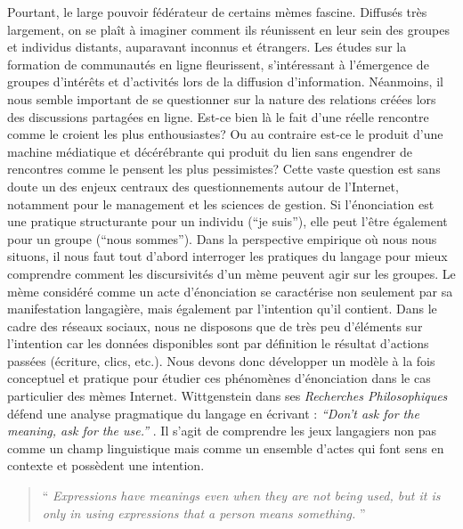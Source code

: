 Pourtant, le large pouvoir fédérateur de certains mèmes fascine. Diffusés très largement, on se plaît à imaginer comment ils réunissent en leur sein des groupes et individus distants, auparavant inconnus et étrangers. Les études sur la formation de communautés en ligne fleurissent, s'intéressant à l'émergence de groupes d{\textquoteright}intérêts et d{\textquoteright}activités lors de la diffusion d'information. Néanmoins, il nous semble important de se questionner sur la nature des relations créées lors des discussions partagées en ligne. Est-ce bien là le fait d{\textquoteright}une réelle rencontre comme le croient les plus enthousiastes? Ou au contraire est-ce le produit d{\textquoteright}une machine médiatique et décérébrante qui produit du lien sans engendrer de rencontres comme le pensent les plus pessimistes? Cette vaste question est sans doute un des enjeux centraux des questionnements autour de l{\textquoteright}Internet, notamment pour le management et les sciences de gestion. Si l{\textquoteright}énonciation est une pratique structurante pour un individu ({\textquotedblleft}je suis{\textquotedblright}), elle peut l{\textquoteright}être également pour un groupe ({\textquotedblleft}nous sommes{\textquotedblright}). Dans la perspective empirique o\`u nous nous situons, il nous faut tout d{\textquoteright}abord interroger les pratiques du langage pour mieux comprendre comment les discursivités d{\textquoteright}un mème peuvent agir sur les groupes. Le mème considéré comme un acte d{\textquoteright}énonciation se caractérise non seulement par sa manifestation langagière, mais également par l{\textquoteright}intention qu{\textquoteright}il contient. Dans le cadre des réseaux sociaux, nous ne disposons que de très peu d{\textquoteright}éléments sur l{\textquoteright}intention car les données disponibles sont par définition le résultat d{\textquoteright}actions passées (écriture, clics, etc.).\textit{ }Nous devons donc développer un modèle à la fois conceptuel et pratique pour étudier ces phénomènes d{\textquoteright}énonciation dans le cas particulier des mèmes Internet. Wittgenstein dans ses \textit{Recherches Philosophiques }défend une analyse pragmatique du langage en écrivant : \textit{{\textquotedblleft}Don{\textquoteright}t ask for the meaning, ask for the use.{\textquotedblright}} \citep{Wittgenstein2004}. Il s{\textquoteright}agit de comprendre les jeux langagiers non pas comme un champ linguistique mais comme un ensemble d{\textquoteright}actes qui font sens en contexte et possèdent une intention. 

\begin{quote}
{\textquotedblleft}
\textit{Expressions have meanings even when they are not being used, but it is only in using expressions that a person means something.}
{\textquotedblright} \citep{Bach1994}
\end{quote}

